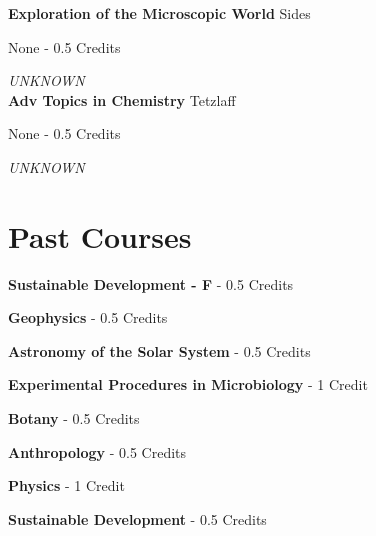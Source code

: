 \noindent\textbf{Exploration of the Microscopic World} \hfill Sides

\noindent None - 0.5 Credits

\vspace{1mm}\emph{UNKNOWN}\\


\noindent\textbf{Adv Topics in Chemistry} \hfill Tetzlaff

\noindent None - 0.5 Credits

\vspace{1mm}\emph{UNKNOWN}\\


\section{Past Courses}

\noindent\textbf{Sustainable Development - F}  - 0.5 Credits

\vspace{3mm}
\noindent\textbf{Geophysics}  - 0.5 Credits

\vspace{3mm}
\noindent\textbf{Astronomy of the Solar System}  - 0.5 Credits

\vspace{3mm}
\noindent\textbf{Experimental Procedures in Microbiology}  - 1 Credit

\vspace{3mm}
\noindent\textbf{Botany}  - 0.5 Credits

\vspace{3mm}
\noindent\textbf{Anthropology}  - 0.5 Credits

\vspace{3mm}
\noindent\textbf{Physics}  - 1 Credit

\vspace{3mm}
\noindent\textbf{Sustainable Development}  - 0.5 Credits

\vspace{3mm}